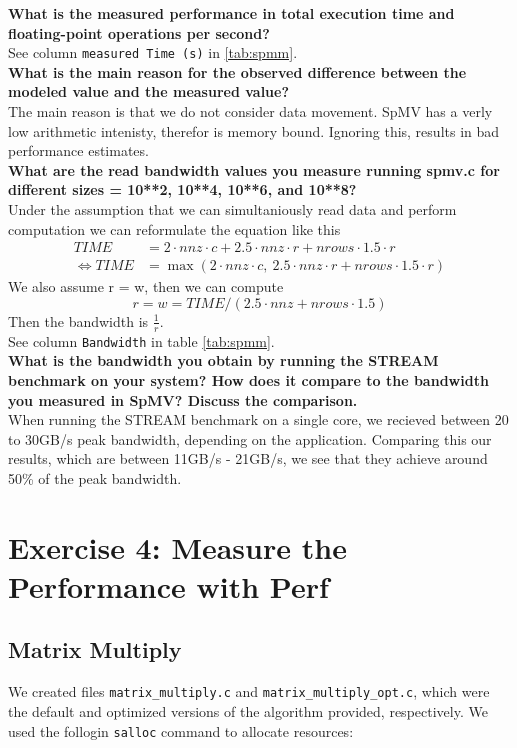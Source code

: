 \documentclass[a4paper,10pt]{article}
\begin{document}
\textbf{What is the measured performance in total execution time and floating-point operations per second?}\\
See column \verb|measured Time (s)| in \ref{tab:spmm}.\\

\textbf{What is the main reason for the observed difference between the modeled value and the measured value?}\\
The main reason is that we do not consider data movement. SpMV has a verly low arithmetic intenisty, therefor is memory bound.
Ignoring this, results in bad performance estimates.\\

\textbf{What are the read bandwidth values you measure running spmv.c for different sizes  = 10**2, 10**4, 10**6, and 10**8?}\\
Under the assumption that we can simultaniously read data and perform computation we can reformulate the equation like this
\begin{align*}
TIME &= 2 \cdot nnz \cdot c + 2.5 \cdot nnz \cdot r + nrows \cdot 1.5 \cdot r\\
\Leftrightarrow TIME &= \max(2 \cdot nnz \cdot c,\ 2.5 \cdot nnz \cdot r + nrows \cdot 1.5 \cdot r)
\end{align*}
We also assume r = w, then we can compute
$$r = w = TIME / (2.5 \cdot nnz + nrows \cdot 1.5)$$
Then the bandwidth is \(\frac{1}{r}\).\\
See column \verb|Bandwidth| in table \ref{tab:spmm}.\\

\textbf{What is the bandwidth you obtain by running the STREAM benchmark on your system? How does it compare to the bandwidth you measured in SpMV? Discuss the comparison.}\\
When running the STREAM benchmark on a single core, we recieved between 20 to 30GB/s peak bandwidth, depending on the application.
Comparing this our results, which are between 11GB/s - 21GB/s, we see that they achieve around 50\% of the peak bandwidth.

\section{Exercise 4: Measure the Performance with Perf}
\subsection{Matrix Multiply}
\label{sec:matrix_multiply}
We created files \verb|matrix_multiply.c| and \verb|matrix_multiply_opt.c|, which were the default and optimized versions of the algorithm provided, respectively. We used the follogin \verb|salloc| command to allocate resources: 
\end{document}
